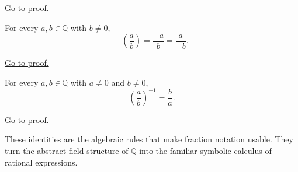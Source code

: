 \begin{remark*}[Proof]
\hyperref[prf:rational-fraction-multiplication]{Go to proof.}
\end{remark*}

\begin{theorem}
\label{thm:rational-fraction-negation}
For every $a,b\in\mathbb{Q}$ with $b\neq 0$,
\[
-\left(\frac{a}{b}\right)
=
\frac{-a}{b}
=
\frac{a}{-b}.
\]
\end{theorem}

\begin{remark*}[Proof]
\hyperref[prf:rational-fraction-negation]{Go to proof.}
\end{remark*}

\begin{theorem}
\label{thm:rational-fraction-reciprocal}
For every $a,b\in\mathbb{Q}$ with $a\neq 0$ and $b\neq 0$,
\[
\left(\frac{a}{b}\right)^{-1}=\frac{b}{a}.
\]
\end{theorem}

\begin{remark*}[Proof]
\hyperref[prf:rational-fraction-reciprocal]{Go to proof.}
\end{remark*}

\begin{remark}
These identities are the algebraic rules that make fraction notation usable.
They turn the abstract field structure of $\mathbb{Q}$ into the familiar
symbolic calculus of rational expressions.
\end{remark}
